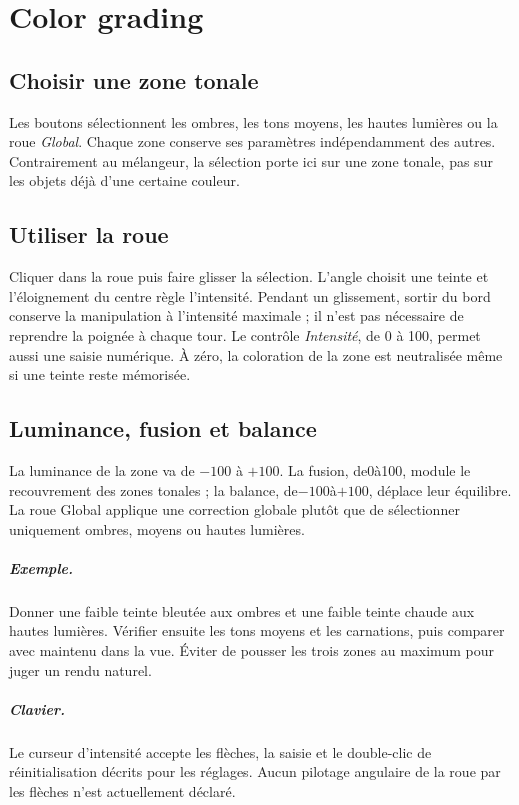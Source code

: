 \chapter{Color grading}
\section{Choisir une zone tonale}
Les boutons sélectionnent les ombres, les tons moyens, les hautes lumières
ou la roue \emph{Global}. Chaque zone conserve ses paramètres indépendamment
des autres. Contrairement au mélangeur, la sélection porte ici sur une zone
tonale, pas sur les objets déjà d’une certaine couleur.

\section{Utiliser la roue}
Cliquer dans la roue puis faire glisser la sélection. L’angle choisit une
teinte et l’éloignement du centre règle l’intensité. Pendant un glissement,
sortir du bord conserve la manipulation à l’intensité maximale ; il n’est
pas nécessaire de reprendre la poignée à chaque tour.
Le contrôle \emph{Intensité}, de 0 à 100, permet aussi une saisie numérique.
À zéro, la coloration de la zone est neutralisée même si une teinte reste mémorisée.

\section{Luminance, fusion et balance}
La luminance de la zone va de $-100$ à $+100$. La fusion, de0à100,
module le recouvrement des zones tonales ; la balance, de$-100$à$+100$,
déplace leur équilibre. La roue Global applique une correction globale plutôt
que de sélectionner uniquement ombres, moyens ou hautes lumières.

\paragraph{Exemple.}
Donner une faible teinte bleutée aux ombres et une faible teinte chaude aux
hautes lumières. Vérifier ensuite les tons moyens et les carnations, puis
comparer avec  maintenu dans la vue. Éviter de pousser les
trois zones au maximum pour juger un rendu naturel.

\paragraph{Clavier.}
Le curseur d’intensité accepte les flèches, la saisie et le double-clic de
réinitialisation décrits pour les réglages. Aucun pilotage angulaire de la
roue par les flèches n’est actuellement déclaré.
